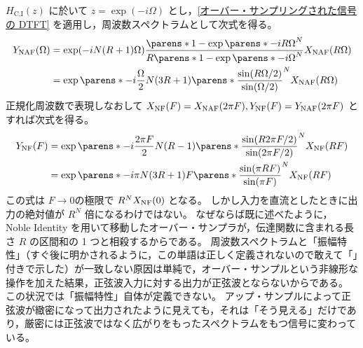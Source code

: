         $H_\text{C,I}(z)$ に於いて $z = \exp(-i\Omega)$ とし，\ref{オーバー・サンプリングされた信号の DTFT} を適用し，周波数スペクトラムとして次式を得る。
        \begin{align*}
            \YNAF(\Omega) &= \exp(-iN(R+1)\Omega)\frac{\parens*{1-\exp\parens*{-iR\Omega}}^N}{R\parens*{1-\exp\parens*{-i\Omega}}^N}\XNAF(R\Omega) \\
            &= \exp\parens*{-i\frac{\Omega}{2}N(3R+1)}\parens*{\frac{\sin(R\Omega/2)}{\sin(\Omega/2)}}^N \XNAF(R\Omega)
        \end{align*}
        正規化周波数で表現しなおして $X_\text{NF}(F) = X_\text{NAF}(2\pi F), Y_\text{NF}(F) = Y_\text{NAF}(2\pi F)$ とすれば次式を得る。
        \begin{align}
            \YNF(F) &= \exp\parens*{-i\frac{2\pi F}{2}N(R-1)}\parens*{\frac{\sin(R 2\pi F/2)}{\sin(2\pi F/2)}}^N \XNF(R F) \nonumber \\
            &= \exp\parens*{-i\pi N(3R+1)F}\parens*{\frac{\sin(\pi R F)}{\sin(\pi F)}}^N \XNF(R F) \label{equation:CIC up-sampler の周波数スペクトラム}
        \end{align}
        この式は $F\to 0$の極限で $R^N X_\text{NF}(0)$ となる。
        しかし入力を直流としたときに出力の絶対値が $R^N$ 倍になるわけではない。
        なぜならば既に述べたように， Noble Identity を用いて移動したオーバー・サンプラが，伝達関数に含まれる長さ $R$ の区間和の 1 つと相殺するからである。
        周波数スペクトラムと「振幅特性」（すぐ後に明かされるように，この単語は正しく定義されないので敢えて「」付きで示した）が一致しない原因は単純で，オーバー・サンプルという非線形な操作を加えた結果，正弦波入力に対する出力が正弦波とならないからである。
        この状況では「振幅特性」自体が定義できない。
        アップ・サンプルによって正弦波が緻密になって出力されたように見えても，それは「そう見える」だけであり，厳密には正弦波ではなく広がりをもったスペクトラムをもつ信号に変わっている。
